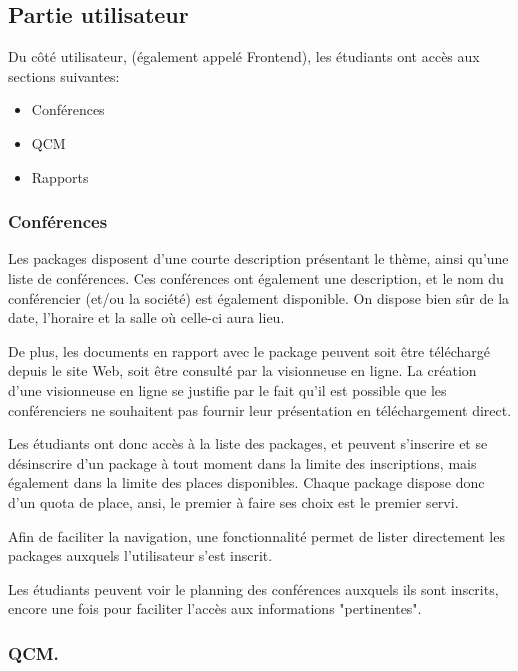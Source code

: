         \subsection{Partie utilisateur}

Du côté utilisateur, (également appelé Frontend), les étudiants ont accès aux sections
suivantes:

    \begin{itemize}
    \item Conférences
    \item QCM
    \item Rapports
    \end{itemize}

            \subsubsection{Conférences}

Les packages disposent d'une courte description présentant le thème, ainsi qu'une
liste de conférences. Ces conférences ont également une description, et le nom du
conférencier (et/ou la société) est également disponible.
On dispose bien sûr de la date, l'horaire et la salle où celle-ci aura lieu.

De plus, les documents en rapport avec le package peuvent soit être téléchargé
depuis le site Web, soit être consulté par la visionneuse en ligne. La création
d'une visionneuse en ligne se justifie par le fait qu'il est possible que les
conférenciers ne souhaitent pas fournir leur présentation en téléchargement direct.

Les étudiants ont donc accès à la liste des packages, et peuvent s'inscrire et
se désinscrire d'un package à tout moment dans la limite des inscriptions, mais
également dans la limite des places disponibles.
Chaque package dispose donc d'un quota de place, ansi, le premier à faire ses choix
est le premier servi.

Afin de faciliter la navigation, une fonctionnalité permet de lister directement
les packages auxquels l'utilisateur s'est inscrit.

Les étudiants peuvent voir le planning des conférences auxquels ils sont inscrits,
encore une fois pour faciliter l'accès aux informations "pertinentes".

            \subsubsection{QCM.}

